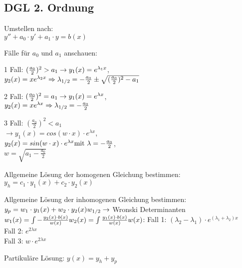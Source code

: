 \documentclass[a4paper, 10pt, landscape]{article}
\begin{document}
\begin{multicols}{5}
\begin{small}
			\subsection{DGL 2. Ordnung}
				\begin{compactenum}	
					\item Umstellen nach:\\$y''+a_0\cdot y'+a_1\cdot y=b(x)$
					\item Fälle für $a_0$ und $a_1$ anschauen:
					\begin{compactenum}
						\item[1 Fall:] $(\frac{a_0}{2})^2>a_1\\
						\rightarrow y_1(x)=e^{\lambda_1x}$,\\ $y_2(x)=xe^{\lambda_2x}\\
						\Rightarrow \lambda_{1/2}=-\frac{a_0}{2}\pm\sqrt{(\frac{a_0}{2})^2-a_1}$
						\item[2 Fall:] $(\frac{a_0}{2})^2=a_1\\
						\rightarrow y_1(x)=e^{\lambda x}$,\\ $y_2(x)=xe^{\lambda x}\\
						\Rightarrow \lambda_{1/2}=-\frac{a_0}{2}$
						\item[3 Fall:] $(\frac{a_0}{2})^2<a_1$\\
						$\rightarrow y_1(x)=cos(w\cdot x)\cdot e^{\lambda x}$,\\
						$y_2(x)=sin(w\cdot x)\cdot e^{\lambda x}\\
						\text{mit } \lambda=-\frac{a_0}{2}$,\\ $w=\sqrt{a_1-\frac{a_0}{2}}$
					\end{compactenum}
					\item Allgemeine Lösung der homogenen Gleichung bestimmen:\\
					$y_h=c_1\cdot y_1(x)+c_2\cdot y_2(x)$
					\item Allgemeine Lösung der inhomogenen Gleichung bestimmen:\\
					$y_p=w_1\cdot y_1(x)+w_2\cdot y_2(x)\\
					w_{1/2} \rightarrow$ Wronski Determinanten\\
					$w_1(x)=\int-\frac{y_2(x)\cdot b(x)}{w(x)}\\
					w_2(x)=\int\frac{y_1(x)\cdot b(x)}{w(x)}\\
					w(x)$: Fall 1: $(\lambda_2-\lambda_1)\cdot e^{(\lambda_1+\lambda_2)x}$\\
					Fall 2: $e^{2\lambda x}$\\
					Fall 3: $w\cdot e^{2\lambda x}$
					\item Partikuläre Lösung: $y(x)=y_h+y_p$
				\end{compactenum}
\end{small}
\end{multicols}
\end{document}
